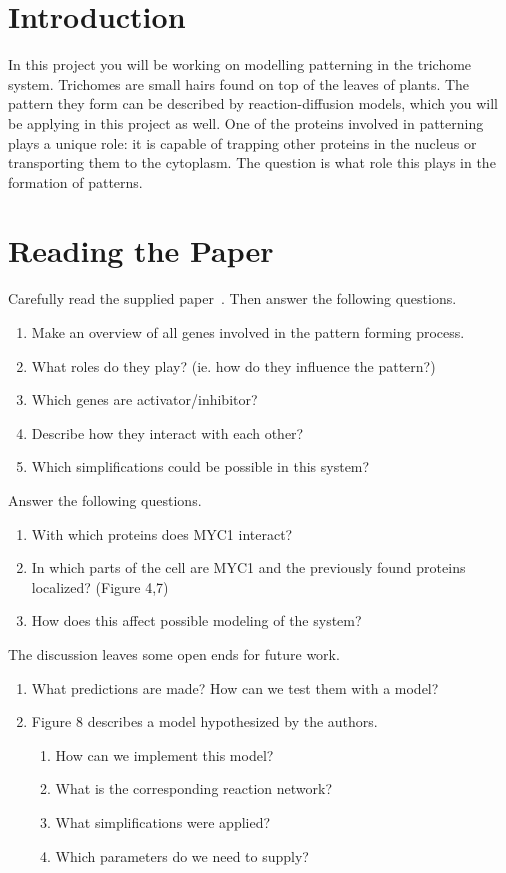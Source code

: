\section{Introduction}
In this project you will be working on modelling patterning in the trichome system.
Trichomes are small hairs found on top of the leaves of plants.
The pattern they form can be described by reaction-diffusion models, which you will be applying in this project as well.
One of the proteins involved in patterning plays a unique role: it is capable of trapping other proteins in the nucleus or transporting them to the cytoplasm.
The question is what role this plays in the formation of patterns.
%
%
\section{Reading the Paper}
Carefully read the supplied paper~\cite{Pesch2013}.
Then answer the following questions.
\begin{enumerate}
    \item Make an overview of all genes involved in the pattern forming process.
    \item What roles do they play? (ie. how do they influence the pattern?)
    \item Which genes are activator/inhibitor?
    \item Describe how they interact with each other?
    \item Which simplifications could be possible in this system?
\end{enumerate}
%
%
Answer the following questions.
\begin{enumerate}
    \item With which proteins does MYC1 interact?
    \item In which parts of the cell are MYC1 and the previously found proteins localized? (Figure 4,7)
    \item How does this affect possible modeling of the system?
\end{enumerate}
%
%
The discussion leaves some open ends for future work.
\begin{enumerate}
    \item What predictions are made?
    How can we test them with a model?
    \item Figure 8 describes a model hypothesized by the authors.
    \begin{enumerate}
        \item How can we implement this model?
        \item What is the corresponding reaction network?
        \item What simplifications were applied?
        \item Which parameters do we need to supply?
    \end{enumerate}
\end{enumerate}
%
%
